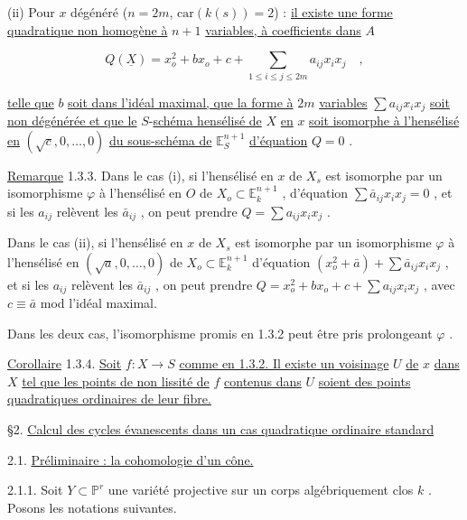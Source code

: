 (ii) Pour $x$ dégénéré ($n = 2m$, $\mathrm{car}(k(s)) = 2$) : \underline{il existe une forme quadratique non homogène à} $n+1$ \underline{variables, à coefficients dans} $A$

\begin{equation}\tag{1.3.2.1}
Q(\underline{X}) = x_o^2 + b x_o + c + \sum_{1 \leq i \leq j \leq 2m} a_{ij} x_i x_j \quad , 
\end{equation}


 \underline{telle que} $b$ \underline{soit dans l'idéal maximal, que la forme à} $2m$ \underline{variables} $\sum a_{ij} x_i x_j$ \underline{soit non dégénérée et que le} $S$-\underline{schéma hensélisé de} $X$ \underline{en} $x$ \underline{soit isomorphe à l'hensélisé en} $(\sqrt{c},0,\ldots,0)$ \underline{du sous-schéma de} $\mathbb{E}^{n+1}_S$ \underline{d'équation} $Q = 0$ .

\underline{Remarque} 1.3.3. Dans le cas (i), si l'hensélisé en $x$ de $X_s$ est isomorphe par un isomorphisme $\varphi$ à l'hensélisé en $O$ de $X_o \subset \mathbb{E}^{n+1}_k$ , d'équation $\sum \bar{a}_{ij} x_i x_j = 0$ , et si les $a_{ij}$ relèvent les $\bar{a}_{ij}$ , on peut prendre $Q = \sum a_{ij} x_i x_j$ .

Dans le cas (ii), si l'hensélisé en $x$ de $X_s$ est isomorphe par un isomorphisme $\varphi$ à l'hensélisé en $(\sqrt{a},0,\ldots,0)$ de $X_o \subset \mathbb{E}^{n+1}_k$ d'équation $(x_o^2 + \bar{a}) + \sum \bar{a}_{ij} x_i x_j$ , et si les $a_{ij}$ relèvent les $\bar{a}_{ij}$ , on peut prendre $Q = x_o^2 + bx_o + c + \sum a_{ij} x_i x_j$ , avec $c \equiv \bar{a}$ mod l'idéal maximal.

Dans les deux cas, l'isomorphisme promis en 1.3.2 peut être pris prolongeant $\varphi$ .

\underline{Corollaire} 1.3.4. \underline{Soit} $f : X \to S$ \underline{comme en 1.3.2. Il existe un voisinage} $U$ \underline{de} $x$ \underline{dans} $X$ \underline{tel que les points de non lissité de} $f$ \underline{contenus dans} $U$ \underline{soient des points quadratiques ordinaires de leur fibre.}




§2. \underline{Calcul des cycles évanescents dans un cas quadratique ordinaire standard}


2.1. \underline{Préliminaire : la cohomologie d'un cône.}

2.1.1. Soit $Y \subset \mathbb{P}^r$ une variété projective sur un corps algébriquement clos $k$ . Posons les notations suivantes.

